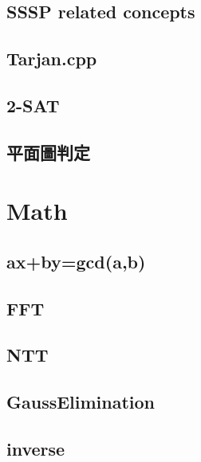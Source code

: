 	\subsection{SSSP related concepts}
		
	\subsection{Tarjan.cpp}
		
	\subsection{2-SAT}
		
%		
	\subsection{平面圖判定}
		


\section{Math}
		
	\subsection{ax+by=gcd(a,b)}
		
%		
	\subsection{FFT}
		
	\subsection{NTT}
		
%		
	\subsection{GaussElimination}
		
	\subsection{inverse}
		
%		
%		

